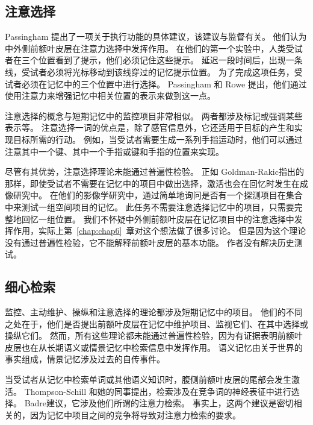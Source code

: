 \subsection{注意选择}

Passingham\cite{passingham2002anatomical} 提出了一项关于执行功能的具体建议，该建议与监督有关。
他们认为中外侧前额叶皮层在注意力选择中发挥作用。
在他们的第一个实验中\cite{rowe2000prefrontal}，人类受试者在三个位置看到了提示，他们必须记住这些提示。
延迟一段时间后，出现一条线，受试者必须将光标移动到该线穿过的记忆提示位置。
为了完成这项任务，受试者必须在记忆中的三个位置中进行选择。 
Passingham 和 Rowe 提出，他们通过使用注意力来增强记忆中相关位置的表示来做到这一点。
\par


注意选择的概念与短期记忆中的监控项目非常相似。
两者都涉及标记或强调某些表示等。
注意选择一词的优点是，除了感官信息外，它还适用于目标的产生和实现目标所需的行动。
例如，当受试者需要生成一系列手指运动时，他们可以通过注意其中一个键、其中一个手指或键和手指的位置来实现。
\par


尽管有其优势，注意选择理论未能通过普遍性检验。
正如 Goldman-Rakic\cite{goldman2002functional}指出的那样，即使受试者不需要在记忆中的项目中做出选择，激活也会在回忆时发生在成像研究中。
在他们的影像学研究中，通过简单地询问是否有一个探测项目在集合中来测试一组空间项目的记忆\cite{leung2005differential}。
此任务不需要注意选择记忆中的项目，只需要完整地回忆一组位置。
我们不怀疑中外侧前额叶皮层在记忆项目中的注意选择中发挥作用，实际上第~\ref{chap:chap6}~章对这个想法做了很多讨论。
但是因为这个理论没有通过普遍性检验，它不能解释前额叶皮层的基本功能。
作者没有解决历史测试。



\subsection{细心检索}

监控、主动维护、操纵和注意选择的理论都涉及短期记忆中的项目。
他们的不同之处在于，他们是否提出前额叶皮层在记忆中维护项目、监视它们、在其中选择或操纵它们。
然而，所有这些理论都未能通过普遍性检验，因为有证据表明前额叶皮层也在从长期语义或情景记忆中检索信息中发挥作用。
语义记忆由关于世界的事实组成，情景记忆涉及过去的自传事件。
\par


当受试者从记忆中检索单词或其他语义知识时，腹侧前额叶皮层的尾部会发生激活。
Thompson-Schill 和她的同事\cite{novick2009case}提出，检索涉及在竞争词的神经表征中进行选择。
Badre\cite{badre2002semantic}建议，它涉及他们所谓的注意力检索。
事实上，这两个建议是密切相关的，因为记忆中项目之间的竞争将导致对注意力检索的要求。
\par



